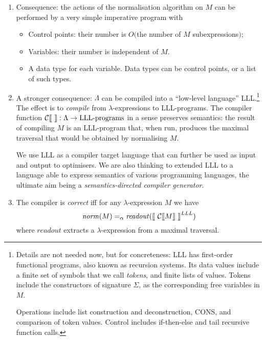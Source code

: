\documentclass{llncs}
\newcommand{\lsem}{\mbox{$\lbrack\hspace{-0.3ex}\lbrack$}}
\newcommand{\rsem}{\mbox{$\rbrack\hspace{-0.3ex}\rbrack$}}
\newcommand{\vair}{\vspace{3mm}}
\newcommand{\lexp}{$\lambda$-expression}
\begin{document}
\begin{enumerate}
\item Consequence: the actions of the normalisation algorithm  on $M$ can be performed by a very simple imperative program with
\vair

\begin{itemize}
\item  Control points: their number is $O($the number of $M$ subexpressions$)$;  
\vair

\item Variables: their number is independent of $M$.
\vair

\item A data type for each variable.  Data types can be control points, or a list of such types.
\end{itemize}
\vair

\item A stronger consequence: $\Lambda$ can be compiled into a ``low-level language'' 
LLL.\footnote
{Details are not needed now, but for concreteness: LLL has first-order functional programs, also known as recursion systems. Its data values include a finite set of symbols that we call {\em tokens}, and finite lists of values.
Tokens include the constructors of signature $\Sigma$, as the corresponding  free variables in $M$.

Operations include  list construction and deconstruction, CONS, and comparison of token values.
Control includes if-then-else and  tail recursive function calls.

}
The effect is to {\em compile} from {\lexp}s to LLL-programs. The compiler  function ${\cal C}\lsem\ \rsem : \Lambda \to \mbox{LLL-programs}$  in a sense preserves semantics: the result of compiling $M$ is an LLL-program that, when run, produces  the maximal traversal that would be obtained by normalising $M$.
\vair

We  use LLL as a compiler target  language that can further be used as input and output to  optimisers. We are also thinking to extended LLL to a language able to express semantics of various programming languages, the ultimate aim being a {\em semantics-directed compiler generator}.

\vair 

\item The compiler is {\em correct} iff for any {\lexp} $M$ we have
$$
\mathit{norm}(M) =_\alpha  \mathit{readout}(\lsem\ {\cal C}\lsem M \rsem \ \rsem^{LLL})
$$
where $\mathit{readout}$ extracts a {\lexp} from  a maximal traversal.
\vair 


\end{enumerate}
\end{document}
